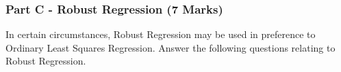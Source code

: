 \documentclass[a4paper,12pt]{article}
\begin{document}
%


\subsubsection*{Part C - Robust Regression (7 Marks)}



In certain circumstances, Robust Regression may be used in preference to Ordinary Least Squares Regression. Answer the following questions relating to Robust Regression. 
\end{document}
